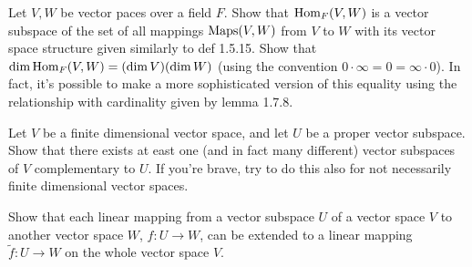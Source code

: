 \item Let $V,W$ be vector paces over a field $F$. Show that $\text{Hom}_{F}(V, W)$ is a vector subspace of the set of all mappings $\text{Maps}(V, W)$ from $V$ to $W$ with its vector space structure given similarly to def 1.5.15. Show that $\dim \text{Hom}_{F}(V, W) = (\dim V) (\dim W)$ (using the convention $0 \cdot \infty = 0 = \infty \cdot 0$). In fact, it's possible to make a more sophisticated version of this equality using the relationship with cardinality given by lemma 1.7.8.
\item Let $V$ be a finite dimensional vector space, and let $U$ be a proper vector subspace. Show that there exists at east one (and in fact many different) vector subspaces of $V$ complementary to $U$. If you're brave, try to do this also for not necessarily finite dimensional vector spaces.
\item Show that each linear mapping from a vector subspace $U$ of a vector space $V$ to another vector space $W$, $f : U \to W$, can be extended to a linear mapping $\tilde{f} : U \to W$ on the whole vector space $V$.
